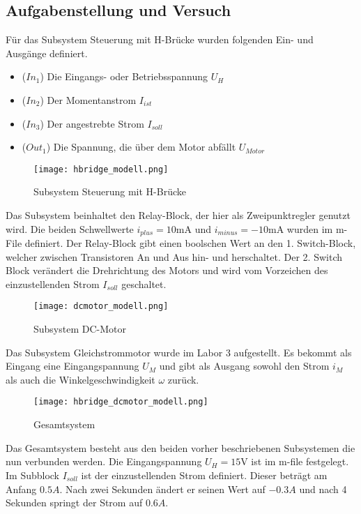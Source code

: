 \subsection{Aufgabenstellung und Versuch}

Für das Subsystem Steuerung mit H-Brücke wurden folgenden Ein- und Ausgänge
definiert.\\

\begin{itemize}
    \item ($In_1$) Die Eingangs- oder Betriebsspannung $U_H$
    \item ($In_2$) Der Momentanstrom $I_{ist}$
    \item ($In_3$) Der angestrebte Strom $I_{soll}$
    \item ($Out_1$) Die Spannung, die über dem Motor abfällt $U_{Motor}$
\end{itemize}


\begin{figure}[H]
    \centering
    \texttt{[image: hbridge\_modell.png]}
    \caption{Subsystem Steuerung mit H-Brücke}
    \label{fig:Subsystem H-Bridge}
\end{figure}

Das Subsystem beinhaltet den Relay-Block, der hier als Zweipunktregler genutzt
wird. Die beiden Schwellwerte $i_{plus}=10\mathrm{mA}$ und $i_{minus}=-10
\mathrm{mA}$ wurden im m-File definiert. Der Relay-Block gibt einen boolschen Wert
an den 1. Switch-Block, welcher zwischen Transistoren An und Aus hin- und
herschaltet. Der 2. Switch Block verändert die Drehrichtung des Motors und
wird vom Vorzeichen des einzustellenden Strom $I_{soll}$ geschaltet.

\begin{figure}[H]
    \centering
    \texttt{[image: dcmotor\_modell.png]}
    \caption{Subsystem DC-Motor}
    \label{fig:Subsystem DC-Motor}
\end{figure}

Das Subsystem Gleichstrommotor wurde im Labor 3 aufgestellt. Es bekommt
als Eingang eine Eingangspannung $U_M$ und gibt als Ausgang sowohl den
Strom $i_M$ als auch die Winkelgeschwindigkeit $\omega$ zurück.

\begin{figure}[H]
    \centering
    \texttt{[image: hbridge\_dcmotor\_modell.png]}
    \caption{Gesamtsystem}
    \label{fig:Gesamtsystem}
\end{figure}

Das Gesamtsystem besteht aus den beiden vorher beschriebenen Subsystemen die nun
verbunden werden. Die Eingangspannung $U_H=15\mathrm{V}$ ist im m-file festgelegt.
Im Subblock $I_{soll}$ ist der einzustellenden Strom definiert. Dieser beträgt
am Anfang $0.5A$. Nach zwei Sekunden ändert er seinen Wert auf $-0.3A$ und nach
4 Sekunden springt der Strom auf $0.6A$.

